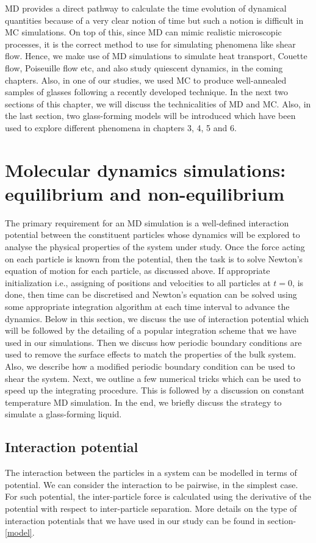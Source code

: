 MD provides a direct pathway to calculate the time evolution of dynamical quantities because of a very clear notion of time but such a notion is difficult in MC simulations. On top of this, since MD can mimic realistic microscopic processes, it is the correct method to use for simulating phenomena like shear flow. Hence, we make use of MD simulations to simulate heat transport, Couette flow, Poiseuille flow etc, and also study quiescent dynamics, in the coming chapters. Also, in one of our studies, we used MC to produce well-annealed samples of glasses following a recently developed technique. In the next two sections of this chapter, we will discuss the technicalities of MD and MC. Also, in the last section, two glass-forming models will be introduced which have been used to explore different phenomena in chapters 3, 4, 5 and 6. 

\section{Molecular dynamics simulations: equilibrium and non-equilibrium}
The primary requirement for an MD simulation is a well-defined interaction potential between the constituent particles whose dynamics will be explored to analyse the physical properties of the system under study. Once the force acting on each particle is known from the potential, then the task is to solve Newton's equation of motion for each particle, as discussed above. If appropriate initialization i.e., assigning of positions and velocities to all particles at $t = 0$, is done, then time can be discretised and Newton's equation can be solved using some appropriate integration algorithm at each time interval to advance the dynamics. Below in this section, we discuss the use of interaction potential which will be followed by the detailing of a popular integration scheme that we have used in our simulations. Then we discuss how periodic boundary conditions are used to remove the surface effects to match the properties of the bulk system. Also, we describe how a modified periodic boundary condition can be used to shear the system. Next, we outline a few numerical tricks which can be used to speed up the integrating procedure. This is followed by a discussion on constant temperature MD simulation. In the end, we briefly discuss the strategy to simulate a glass-forming liquid.

    \subsection{Interaction potential}
    The interaction between the particles in a system can be modelled in terms of potential. We can consider the interaction to be pairwise, in the simplest case. For such potential, the inter-particle force is calculated using the derivative of the potential with respect to inter-particle separation. More details on the type of interaction potentials that we have used in our study can be found in section-\ref{model}.
    
